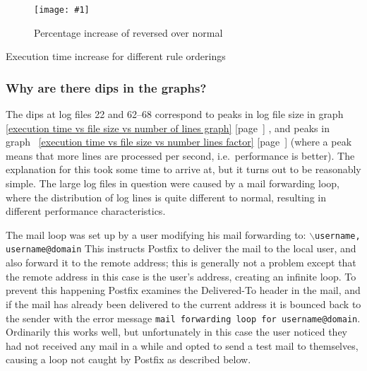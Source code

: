 \documentclass[a4paper,12pt,draft]{article}
\newcommand{\showgraph}[3]{
    \begin{figure}[hbt!]
        \caption{#2}\label{#3}
        \texttt{[image: \#1]}
    \end{figure}
}
\newcommand{\showtable}[3]{
    \begin{table}[ht]
        \caption{#2}\label{#3}
        
    \end{table}
}
\newcommand{\refwithpage}[1]{%
    \empty{}\ref{#1} [page~\pageref{#1}]%
}
\newcommand{\tab}[0]{%
    \hspace*{2em}%
}
\begin{document}
\showgraph{build/plot-normal-reverse-factor}{Percentage increase of
reversed over normal}{percentage increase of reversed over normal}

\showtable{build/stats-normal-shuffle-reverse-include}{Execution time
increase for different rule orderings}{Execution time increase for
different rule orderings}

\subsubsection{Why are there dips in the graphs?}
\label{Why are there dips in the graphs?}

The dips at log files 22 and 62--68 correspond to peaks in log file size in
graph~\refwithpage{execution time vs file size vs number of lines graph},
and peaks in graph~\refwithpage{execution time vs file size vs number lines
factor} (where a peak means that more lines are processed per second, i.e.\
performance is better).  The explanation for this took some time to arrive
at, but it turns out to be reasonably simple.  The large log files in
question were caused by a mail forwarding loop, where the distribution of
log lines is quite different to normal, resulting in different performance
characteristics.

The mail loop was set up by a user modifying his mail forwarding to:
\newline \tab{}\texttt{$\backslash$username, username@domain} \newline This
instructs Postfix to deliver the mail to the local user, and also forward
it to the remote address; this is generally not a problem except that the
remote address in this case is the user's address, creating an infinite
loop.  To prevent this happening Postfix examines the Delivered-To header
in the mail, and if the mail has already been delivered to the current
address it is bounced back to the sender with the error message
\texttt{mail forwarding loop for username@domain}.  Ordinarily this works
well, but unfortunately in this case the user noticed they had not received
any mail in a while and opted to send a test mail to themselves, causing a
loop not caught by Postfix as described below.
\end{document}
